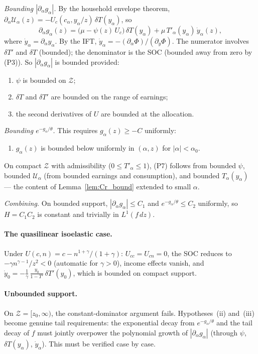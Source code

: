 \documentclass[12pt,a4paper]{article}
\theoremstyle{definition}
\theoremstyle{plain}
\theoremstyle{remark}
\newcommand{\zlow}{z_{\scriptscriptstyle 0}}
\newcommand{\calU}{\mathcal{U}}
\newcommand{\calZ}{\mathcal{Z}}
\begin{document}
\emph{Bounding $|\partial_\alpha g_\alpha|$.}
By the household envelope theorem,
$\partial_\alpha \calU_\alpha(z)
= -U_c(c_\alpha, y_\alpha/z)\,\delta T(y_\alpha)$,
so
\[
  \partial_\alpha g_\alpha(z)
  = \bigl(\mu - \psi(z)\,U_c\bigr)\,
  \delta T(y_\alpha)
  + \mu\,T'_\alpha(y_\alpha)\,\dot y_\alpha(z),
\]
where $\dot y_\alpha = \partial_\alpha y_\alpha$.
By the IFT,
$\dot y_\alpha = -(\partial_\alpha\Phi)/
(\partial_y\Phi)$.
The numerator involves $\delta T'$ and $\delta T$
(bounded); the denominator is the SOC (bounded away from
zero by (P3)).  So $|\partial_\alpha g_\alpha|$ is
bounded provided:
\begin{enumerate}[label=(P\arabic*),resume]
\item $\psi$ is bounded on $\calZ$;
\item $\delta T$ and $\delta T'$ are bounded on the range
  of earnings;
\item the second derivatives of $U$ are bounded at the
  allocation.
\end{enumerate}

\emph{Bounding $e^{-g_\alpha/\theta}$.}
This requires $g_\alpha(z) \geq -C$ uniformly:
\begin{enumerate}[label=(P\arabic*),resume]
\item $g_\alpha(z)$ is bounded below uniformly in
  $(\alpha, z)$ for $|\alpha| < \alpha_0$.
\end{enumerate}
On compact $\calZ$ with admissibility
($0 \leq T'_\alpha \leq 1$), (P7) follows from bounded
$\psi$, bounded $\calU_\alpha$ (from bounded earnings
and consumption), and bounded $T_\alpha(y_\alpha)$
--- the content of Lemma~\ref{lem:Cr_bound} extended to
small $\alpha$.

\emph{Combining.}
On bounded support,
$|\partial_\alpha g_\alpha| \leq C_1$ and
$e^{-g_\alpha/\theta} \leq C_2$ uniformly, so
$H = C_1 C_2$ is constant and trivially in $L^1(f\,dz)$.

\paragraph{The quasilinear isoelastic case.}
Under $U(c,n) = c - n^{1+\gamma}/(1+\gamma)$:
$U_{cc} = U_{cn} = 0$, the SOC reduces to
$-\gamma n^{\gamma-1}/z^2 < 0$ (automatic for
$\gamma > 0$), income effects vanish, and
$\dot y_0 = -\frac{1}{\gamma}\,
\frac{y_0}{1-T'}\,\delta T'(y_0)$,
which is bounded on compact support.

\paragraph{Unbounded support.}
On $\calZ = [\zlow, \infty)$, the constant-dominator
argument fails.  Hypotheses~(ii) and~(iii) become genuine
tail requirements: the exponential decay from
$e^{-g_\alpha/\theta}$ and the tail decay of $f$ must
jointly overpower the polynomial growth of
$|\partial_\alpha g_\alpha|$ (through $\psi$,
$\delta T(y_\alpha)$, $\dot y_\alpha$).  This must be
verified case by case.
\end{document}
